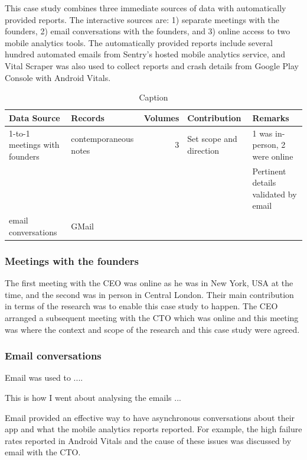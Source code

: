 This case study combines three immediate sources of data with automatically provided reports. The interactive sources are: 1) separate meetings with the founders, 2) email conversations with the founders, and 3) online access to two mobile analytics tools. The automatically provided reports include several hundred automated emails from Sentry's hosted mobile analytics service, and Vital Scraper was also used to collect reports and crash details from Google Play Console with Android Vitals.

\begin{table}
    \centering
    \begin{tabular}{llrll}
        Data Source & Records & Volumes & Contribution & Remarks \\
        \toprule
         1-to-1 meetings with founders & contemporaneous notes & 3 & Set scope and direction & 1 was in-person, 2 were online \\
         & & & & Pertinent details validated by email \\
         \midrule
         email conversations & GMail & & & \\
         \bottomrule
    \end{tabular}
    \caption{Caption}
    \label{tab:my_label}
\end{table}

\subsubsection{Meetings with the founders}

The first meeting with the CEO was online as he was in New York, USA at the time, and the second was in person in Central London. Their main contribution in terms of the research was to enable this case study to happen. The CEO arranged a subsequent meeting with the CTO which was online and this meeting was where the context and scope of the research and this case study were agreed. 

\subsubsection{Email conversations}
Email was used to ....

This is how I went about analysing the emails ...

Email provided an effective way to have asynchronous conversations about their app and what the mobile analytics reports reported. For example, the high failure rates reported in Android Vitals and the cause of these issues was discussed by email with the CTO. 

